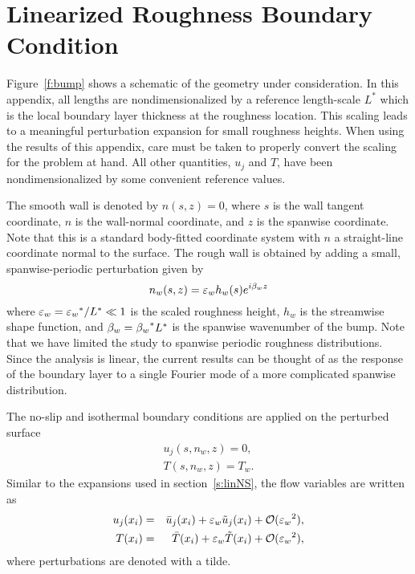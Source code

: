 %
%
%
%
%
\chapter{Linearized Roughness Boundary Condition \label{a:bumpbc}}

Figure~\ref{f:bump} shows a schematic of the geometry under consideration.  In
this appendix, all lengths are nondimensionalized by a reference length-scale
$L^*$ which is the local boundary layer thickness at the roughness location.
This scaling leads to a meaningful perturbation expansion for small roughness
heights.  When using the results of this appendix, care must be taken to
properly convert the scaling for the problem at hand.  All other quantities,
$u_j$ and $T$, have been nondimensionalized by some convenient reference
values.

The smooth wall is denoted by $n(s,z)=0$, where $s$ is the wall tangent
coordinate, $n$ is the wall-normal coordinate, and $z$ is the spanwise
coordinate.  Note that this is a standard body-fitted coordinate system with
$n$ a straight-line coordinate normal to the surface.  The rough wall is
obtained by adding a small, spanwise-periodic perturbation given by
%
\begin{equation} \label{e:bump.w}
  n_w(s,z) = {\varepsilon_w} h_w(s) e^{i {\beta_{w}} z}
\end{equation}
%
where ${\varepsilon_w} = {\varepsilon_w}^* / L^* \ll 1$ is the scaled roughness height, $h_w$ is the
streamwise shape function, and ${\beta_{w}} = {\beta_{w}}^* L^*$ is the spanwise wavenumber of
the bump.  Note that we have limited the study to spanwise periodic roughness
distributions.  Since the analysis is linear, the current results can be
thought of as the response of the boundary layer to a single Fourier mode of a
more complicated spanwise distribution.

The no-slip and isothermal boundary conditions are applied on the perturbed
surface
%
\begin{eqnarray} \label{e:bump.bc}
  u_j(s,n_w,z) = 0 , \\ 
  T(s,n_w,z) = T_w .
\end{eqnarray}
%
Similar to the expansions used in section~\ref{s:linNS}, the flow variables
are written as
%
\begin{eqnarray} \label{e:bump.var}
    u_j(x_i) &=& \bar u_j(x_i) + {\varepsilon_w} \tilde u_j(x_i) + 
                 {\cal O}({\varepsilon_w}^2), \label{e:bump.u} \\
      T(x_i) &=& \bar T(x_i)   + {\varepsilon_w} \tilde T(x_i) +   
                 {\cal O}({\varepsilon_w}^2), \label{e:bump.t}
\end{eqnarray}
%
where perturbations are denoted with a tilde.

